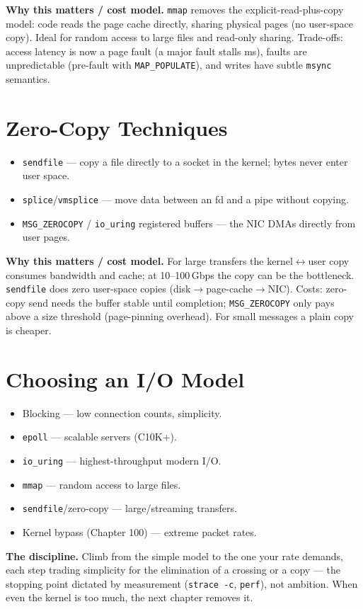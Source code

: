 \textbf{Why this matters / cost model.} \texttt{mmap} removes the explicit-read-plus-copy model: code reads the page cache directly, sharing physical pages (no user-space copy). Ideal for random access to large files and read-only sharing. Trade-offs: access latency is now a page fault (a major fault stalls ms), faults are unpredictable (pre-fault with \texttt{MAP\_POPULATE}), and writes have subtle \texttt{msync} semantics.

\section{Zero-Copy Techniques}
\begin{itemize}
\item \texttt{sendfile} --- copy a file directly to a socket in the kernel; bytes never enter user space.
\item \texttt{splice}/\texttt{vmsplice} --- move data between an fd and a pipe without copying.
\item \texttt{MSG\_ZEROCOPY} / \texttt{io\_uring} registered buffers --- the NIC DMAs directly from user pages.
\end{itemize}

\textbf{Why this matters / cost model.} For large transfers the kernel$\leftrightarrow$user copy consumes bandwidth and cache; at 10--100\,Gbps the copy can be the bottleneck. \texttt{sendfile} does zero user-space copies (disk$\to$page-cache$\to$NIC). Costs: zero-copy send needs the buffer stable until completion; \texttt{MSG\_ZEROCOPY} only pays above a size threshold (page-pinning overhead). For small messages a plain copy is cheaper.

\section{Choosing an I/O Model}
\begin{itemize}
\item Blocking --- low connection counts, simplicity.
\item \texttt{epoll} --- scalable servers (C10K+).
\item \texttt{io\_uring} --- highest-throughput modern I/O.
\item \texttt{mmap} --- random access to large files.
\item \texttt{sendfile}/zero-copy --- large/streaming transfers.
\item Kernel bypass (Chapter 100) --- extreme packet rates.
\end{itemize}

\textbf{The discipline.} Climb from the simple model to the one your rate demands, each step trading simplicity for the elimination of a crossing or a copy --- the stopping point dictated by measurement (\texttt{strace -c}, \texttt{perf}), not ambition. When even the kernel is too much, the next chapter removes it.
